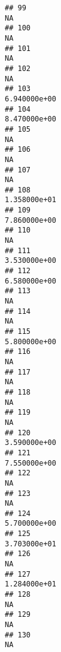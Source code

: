\documentclass[
]{article}
\begin{document}
\begin{verbatim}
## 99                                                                          NA
## 100                                                                         NA
## 101                                                                         NA
## 102                                                                         NA
## 103                                                               6.940000e+00
## 104                                                               8.470000e+00
## 105                                                                         NA
## 106                                                                         NA
## 107                                                                         NA
## 108                                                               1.358000e+01
## 109                                                               7.860000e+00
## 110                                                                         NA
## 111                                                               3.530000e+00
## 112                                                               6.580000e+00
## 113                                                                         NA
## 114                                                                         NA
## 115                                                               5.800000e+00
## 116                                                                         NA
## 117                                                                         NA
## 118                                                                         NA
## 119                                                                         NA
## 120                                                               3.590000e+00
## 121                                                               7.550000e+00
## 122                                                                         NA
## 123                                                                         NA
## 124                                                               5.700000e+00
## 125                                                               3.703000e+01
## 126                                                                         NA
## 127                                                               1.284000e+01
## 128                                                                         NA
## 129                                                                         NA
## 130                                                                         NA

\end{verbatim}
\end{document}
